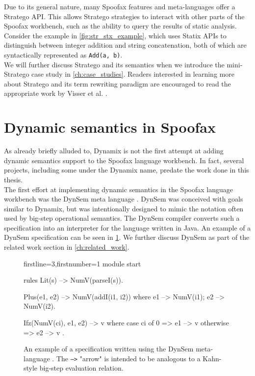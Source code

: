 Due to its general nature, many Spoofax features and meta-languages offer a Stratego API. This allows Stratego strategies to interact with other parts of the Spoofax workbench, such as the ability to query the results of static analysis. Consider the example in \cref{fig:str_stx_example}, which uses Statix APIs to distinguish between integer addition and string concatenation, both of which are syntactically represented as \texttt{Add(a, b)}.\\

We will further discuss Stratego and its semantics when we introduce the mini-Stratego case study in \cref{ch:case_studies}. Readers interested in learning more about Stratego and its term rewriting paradigm are encouraged to read the appropriate work by Visser et al. \cite{KallebergV07,Visser05-SCAM}.

\section{Dynamic semantics in Spoofax}
\label{sec:background_spoofax_dynamics}
As already briefly alluded to, Dynamix is not the first attempt at adding dynamic semantics support to the Spoofax language workbench. In fact, several projects, including some under the Dynamix name, predate the work done in this thesis.\\

The first effort at implementing dynamic semantics in the Spoofax language workbench was the DynSem meta language \cite{VerguNV15}. DynSem was conceived with goals similar to Dynamix, but was intentionally designed to mimic the notation often used by big-step operational semantics. The DynSem compiler converts such a specification into an interpreter for the language written in Java. An example of a DynSem specification can be seen in \cref{fig:dynsem_example}. We further discuss DynSem as part of the related work section in \cref{ch:related_work}.\\

\begin{figure}
  \begin{dynsem*}{firstline=3,firstnumber=1}
module start

rules
  Lit(s) --> NumV(parseI(s)).

  Plus(e1, e2) --> NumV(addI(i1, i2))
  where
    e1 --> NumV(i1);
    e2 --> NumV(i2).

  Ifz(NumV(ci), e1, e2) --> v
  where
    case ci of {
      0 => e1 --> v
      otherwise => e2 --> v
    }.
  \end{dynsem*}
  \caption{An example of a specification written using the DynSem meta-language \cite{VerguNV15}. The \texttt{-->} "arrow" is intended to be analogous to a Kahn-style big-step evaluation relation. }
  \label{fig:dynsem_example}
\end{figure}

